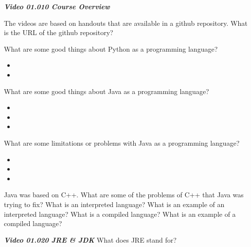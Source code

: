 \documentclass[11pt]{exam}
\begin{document}
%
%

\textit{\textbf{Video 01.010 Course Overview}}

\begin{questions}

\question The videos are based on handouts that are available in a github repository.  What is the URL of the github repository?
\vspace{.5cm}

\question What are some good things about Python as a programming language?
\begin{itemize}
        \item
        \item 
\end{itemize}
\question What are some good things about Java as a programming language?
\begin{itemize}
        \item
        \item 
        \item 
\end{itemize}

\begin{samepage}
\question What are some limitations or problems with Java as a programming language?
\begin{itemize}
    \item
    \item 
    \item 
\end{itemize}
\end{samepage}

\question Java was based on C++.  What are some of the problems of C++ that Java was trying to fix?
\vspace{1cm}
\question What is an interpreted language?  What is an example of an interpreted language?
\vspace{1cm}
\question What is a compiled language?  What is an example of a compiled language?
\vspace{.5cm}

\textit{\textbf{Video 01.020 JRE \& JDK}}
\question What does JRE stand for?


\end{questions}
\end{document}
